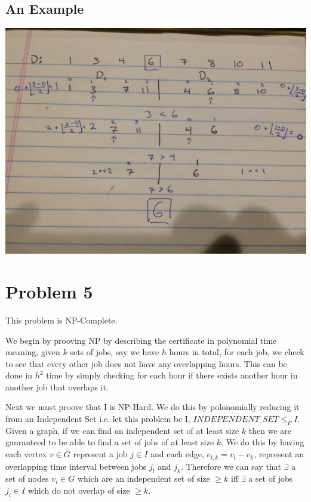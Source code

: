 \documentclass[12pt]{article}
\begin{document}
\subsection{An Example}
\includegraphics[width=\textwidth]{example4}

\newpage





\section{Problem 5}
This problem is NP-Complete.

We begin by prooving NP by describing the certificate in polynomial time meaning,
given $k$ sets of jobs, say we have $h$ hours in total, for each job, we check to see that every other job does
not have any overlapping hours. This can be done in $h^2$ time by simply checking for each hour if there exists
another hour in another job that overlaps it.

Next we must proove that I is NP-Hard. We do this by polonomially reducing it from an Independent Set i.e.
let this problem be I, $INDEPENDENT\_SET \leq_P I$. Given a graph, if we can find an independent set of at least
size $k$ then we are gauranteed to be able to find a set of jobs of at least size $k$. We do this by having each
vertex $v \in G$ represent a job $j \in I$ and each edge, $e_{l,k} = v_l - v_k$, represent an overlapping time
interval between jobs $j_l$ and $j_k$. Therefore we can say that $\exists$ a set of nodes $v_i \in G$ which are
an independent set of size $\geq k$ iff $\exists$ a set of jobs $j_i \in I$ which do not overlap of size $\geq k$.
\end{document}
